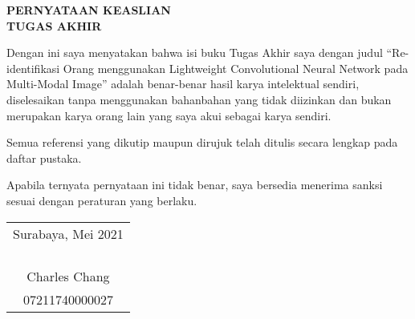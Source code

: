 \begin{center}
  \large
  \textbf{PERNYATAAN KEASLIAN\\TUGAS AKHIR}
\end{center}

\thispagestyle{empty}

\vspace{2ex}


Dengan ini saya menyatakan bahwa isi buku Tugas Akhir saya dengan judul “Re-identifikasi Orang menggunakan Lightweight Convolutional Neural Network pada Multi-Modal Image” adalah benar-benar hasil karya intelektual sendiri, diselesaikan tanpa menggunakan bahanbahan yang tidak diizinkan dan bukan merupakan karya orang lain yang saya akui sebagai karya sendiri.

Semua referensi yang dikutip maupun dirujuk telah ditulis secara lengkap pada daftar pustaka.

Apabila ternyata pernyataan ini tidak benar, saya bersedia menerima
sanksi sesuai dengan peraturan yang berlaku.

\vspace{4ex}

\begin{flushright}
  \begin{tabular}[b]{c}
    Surabaya, Mei 2021\\
    \\
    \\
    \\
    \\
    Charles Chang\\
    07211740000027
  \end{tabular}
\end{flushright}
